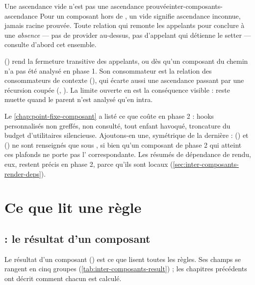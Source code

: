 \begin{invariant}{Une ascendance vide n'est pas une ascendance prouvée}{inter-composants-ascendance}
Pour un composant hors de , un  vide signifie
\og ascendance inconnue\fg, jamais \og racine prouvée\fg. Toute relation qui remonte les appelants
pour conclure à une \emph{absence} --- pas de provider au-dessus, pas d'appelant qui détienne le
setter --- consulte d'abord cet ensemble.
\end{invariant}

 () rend la fermeture
transitive des appelants, ou  dès qu'un composant du chemin n'a pas été analysé en
phase 1. Son consommateur est la relation des consommateurs de contexte
(), qui écarte aussi une ascendance passant par
une récursion coupée (,
). La limite ouverte  en est la
conséquence visible :  reste muette quand le parent n'est
analysé qu'en intra.

Le \cref{chap:point-fixe-composant} a listé ce que  coûte en phase 2 : hooks
personnalisés non greffés,  non consulté, tout enfant havoqué, troncature
du budget d'utilitaires silencieuse. Ajoutons-en une, symétrique de la dernière :
 () et
 () ne sont renseignés que
sous , si bien qu'un composant de phase 2 qui atteint ces plafonds ne porte pas
l'\Info{} correspondante. Les résumés de dépendance de rendu, eux, restent précis en phase 2,
parce qu'ils sont locaux (\cref{sec:inter-composants-render-deps}).

\section{Ce que lit une règle}
\label{sec:inter-composants-resultats}

\subsection{ : le résultat d'un composant}

Le résultat d'un composant () est ce que lisent
toutes les règles. Ses champs se rangent en cinq groupes (\cref{tab:inter-composants-result}) ;
les chapitres précédents ont décrit comment chacun est calculé.

